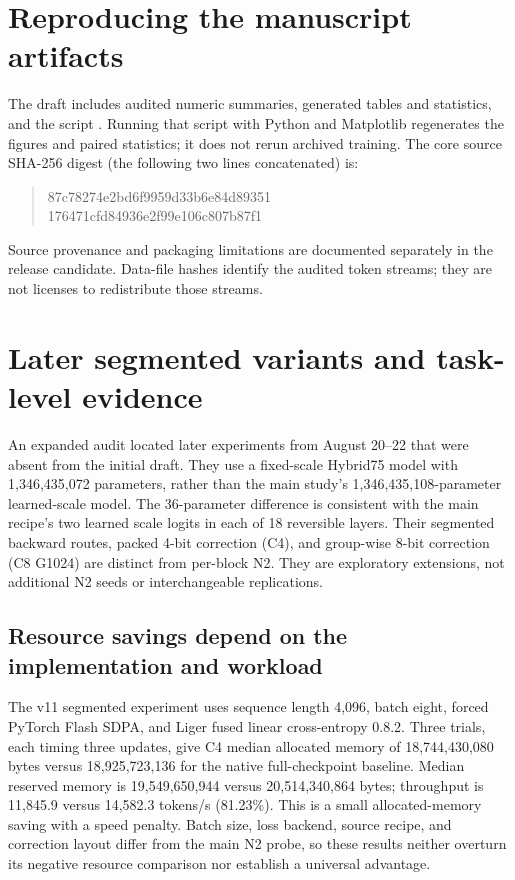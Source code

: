 \documentclass[10pt]{article}
\begin{document}
\appendix
\section{Reproducing the manuscript artifacts}
The draft includes audited numeric summaries, generated tables and statistics, and the script . Running that script with Python and Matplotlib regenerates the figures and paired statistics; it does not rerun archived training. The core source SHA-256 digest (the following two lines concatenated) is:
\begin{quote}\ttfamily\small
87c78274e2bd6f9959d33b6e84d89351\\
176471cfd84936e2f99e106c807b87f1
\end{quote}
 Source provenance and packaging limitations are documented separately in the release candidate. Data-file hashes identify the audited token streams; they are not licenses to redistribute those streams.


\section{Later segmented variants and task-level evidence}
\label{app:later}
An expanded audit located later experiments from August 20--22 that were absent from the initial draft. They use a fixed-scale Hybrid75 model with 1,346,435,072 parameters, rather than the main study's 1,346,435,108-parameter learned-scale model. The 36-parameter difference is consistent with the main recipe's two learned scale logits in each of 18 reversible layers. Their segmented backward routes, packed 4-bit correction (C4), and group-wise 8-bit correction (C8 G1024) are distinct from per-block N2. They are exploratory extensions, not additional N2 seeds or interchangeable replications.

\subsection{Resource savings depend on the implementation and workload}
The v11 segmented experiment uses sequence length 4,096, batch eight, forced PyTorch Flash SDPA, and Liger fused linear cross-entropy 0.8.2. Three trials, each timing three updates, give C4 median allocated memory of 18,744,430,080 bytes versus 18,925,723,136 for the native full-checkpoint baseline. Median reserved memory is 19,549,650,944 versus 20,514,340,864 bytes; throughput is 11,845.9 versus 14,582.3 tokens/s (81.23\%). This is a small allocated-memory saving with a speed penalty. Batch size, loss backend, source recipe, and correction layout differ from the main N2 probe, so these results neither overturn its negative resource comparison nor establish a universal advantage.
\end{document}
